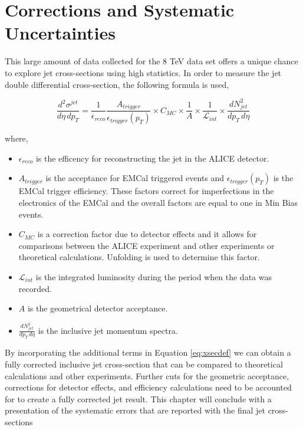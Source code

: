 \chapter{Corrections and Systematic Uncertainties} \label{ch:error}

This large amount of data collected for the 8 TeV data set offers a unique chance to explore jet cross-sections using high statistics.   In order to measure the jet double differential cross-section, the following formula is used,

\begin{equation}
	\frac{d^{2} \sigma^{jet}}{d\eta \, dp_{T}} = \frac{1}{\epsilon_{reco}} \frac{A_{trigger}}{\epsilon_{trigger}(p_{T})} \times C_{MC} \times \frac{1}{A} \times \frac{1}{\mathscr{L}_{int}} \times \frac{dN^{2}_{jet}}{dp_{T} \, d\eta}
\label{eq:xsecdef}
\end{equation}

\noindent
where,

\begin{itemize}
  \item $\epsilon_{reco}$ is the efficency for reconstructing the jet in the ALICE detector.
  \item $A_{trigger}$ is the acceptance for EMCal triggered events and $\epsilon_{trigger}(p_{T})$ is the EMCal trigger efficiency.  These factors correct for imperfections in the electronics of the EMCal and the overall factors are equal to one in Min Bias events.
  \item $C_{MC}$ is a correction factor due to detector effects and it allows for comparisons between the ALICE experiment and other experiments or theoretical calculations.  Unfolding is used to determine this factor.
  \item $\mathscr{L}_{int}$ is the integrated luminosity during the period when the data was recorded.
  \item $A$ is the geometrical detector acceptance.
  \item $\frac{dN^{2}_{jet}}{dp_{T} \, d\eta}$ is the inclusive jet momentum spectra.
  
\end{itemize}

By incorporating the additional terms in Equation \ref{eq:xsecdef} we can obtain a fully corrected inclusive jet cross-section that can be compared to theoretical calculations and other experiments.  Further cuts for the geometric acceptance, corrections for detector effects, and efficiency calculations need to be accounted for to create a fully corrected jet result.  This chapter will conclude with a presentation of the systematic errors that are reported with the final jet cross-sections

